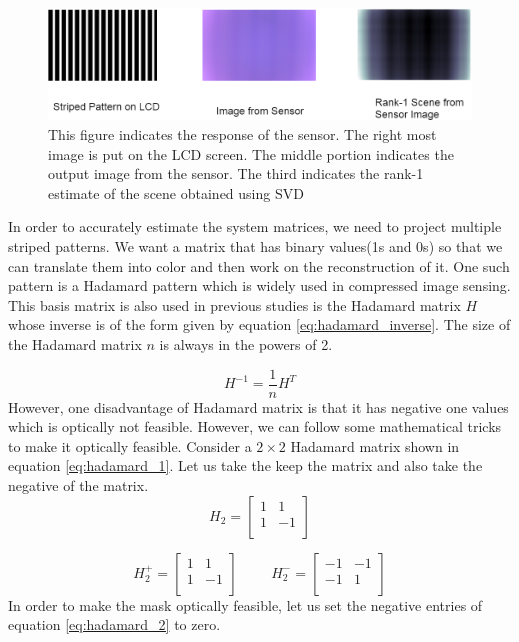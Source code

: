 \begin{figure}[h]
\centering
\includegraphics[width = \linewidth]{pics/Striped_Pattern_Response.png}
\caption{This figure indicates the response of the sensor. The right most image is put on the LCD screen. The middle portion indicates the output image from the sensor. The third indicates the rank-1 estimate of the scene obtained using SVD}
\label{fig:str_response}
\end{figure}

In order to accurately estimate the system matrices, we need to project multiple striped patterns. 
We want a matrix that has binary values(1s and 0s) so that we can translate them into color and then work on the reconstruction of it. One such pattern is a Hadamard pattern which is widely used in compressed image sensing\cite{hadamard}\cite{Flatcam}. This basis matrix is also used in previous studies is the Hadamard matrix $H$ whose inverse is of the form given by equation \ref{eq:hadamard_inverse}. The size of the Hadamard matrix $n$ is always in the powers of 2.

\begin{equation}
H^{-1} = \frac{1}{n} H^T
\label{eq:hadamard_inverse}
\end{equation}
However, one disadvantage of Hadamard matrix is that it has negative one values which is optically not feasible. However, we can follow some mathematical tricks to make it optically feasible. Consider a $2 \times 2$ Hadamard matrix shown in equation \ref{eq:hadamard_1}. Let us take the keep the matrix and also take the negative of the matrix.
\begin{equation}
H_2 = \begin{bmatrix} 
       1 & 1 \\
       1 & -1 \\
    \end{bmatrix}
    \label{eq:hadamard_1}
\end{equation}

\begin{equation}
H_2^+ = \begin{bmatrix} 
       1 & 1 \\
       1 & -1 \\
    \end{bmatrix}
   \hspace{1cm}
   H_2^- = \begin{bmatrix} 
       -1 & -1 \\
       -1 & 1 \\
    \end{bmatrix}
    \label{eq:hadamard_2}
\end{equation}
In order to make the mask optically feasible, let us set the negative entries of equation \ref{eq:hadamard_2} to zero.


